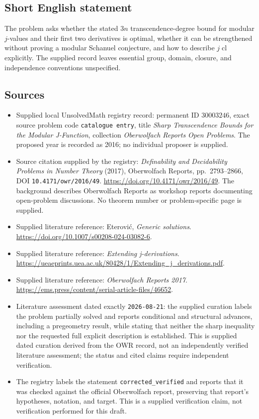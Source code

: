 \documentclass[11pt]{article}
\begin{document}
\subsection{Short English statement}
The problem asks whether the stated \(3n\) transcendence-degree bound for modular \(j\)-values and their first two derivatives is optimal, whether it can be strengthened without proving a modular Schanuel conjecture, and how to describe \(j\operatorname{cl}\) explicitly. The supplied record leaves essential group, domain, closure, and independence conventions unspecified.
\subsection{Sources}
\begin{itemize}
\item Supplied local UnsolvedMath registry record: permanent ID \(30003246\), exact source problem code \texttt{catalogue entry}, title \emph{Sharp Transcendence Bounds for the Modular J-Function}, collection \emph{Oberwolfach Reports Open Problems}. The proposed year is recorded as 2016; no individual proposer is supplied.
\item Source citation supplied by the registry: \emph{Definability and Decidability Problems in Number Theory} (2017), Oberwolfach Reports, pp.~2793--2866, DOI \texttt{10.4171/owr/2016/49}. \url{https://doi.org/10.4171/owr/2016/49}. The background describes Oberwolfach Reports as workshop reports documenting open-problem discussions. No theorem number or problem-specific page is supplied.
\item Supplied literature reference: Eterovi\'c, \emph{Generic solutions}. \url{https://doi.org/10.1007/s00208-024-03082-6}.
\item Supplied literature reference: \emph{Extending j-derivations}. \url{https://ueaeprints.uea.ac.uk/80428/1/Extending_j_derivations.pdf}.
\item Supplied literature reference: \emph{Oberwolfach Reports 2017}. \url{https://ems.press/content/serial-article-files/46652}.
\item Literature assessment dated exactly \texttt{2026-08-21}: the supplied curation labels the problem partially solved and reports conditional and structural advances, including a pregeometry result, while stating that neither the sharp inequality nor the requested full explicit description is established. This is supplied dated curation derived from the OWR record, not an independently verified literature assessment; the status and cited claims require independent verification.
\item The registry labels the statement \texttt{corrected\_verified} and reports that it was checked against the official Oberwolfach report, preserving that report's hypotheses, notation, and target. This is a supplied verification claim, not verification performed for this draft.
\end{itemize}
\end{document}
